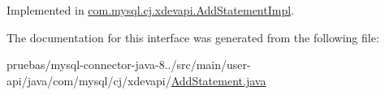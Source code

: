 Implemented in \mbox{\hyperlink{classcom_1_1mysql_1_1cj_1_1xdevapi_1_1_add_statement_impl_a8470fab763b1cfa3555d5dfd7854df2c}{com.\+mysql.\+cj.\+xdevapi.\+Add\+Statement\+Impl}}.



The documentation for this interface was generated from the following file\+:\begin{DoxyCompactItemize}
\item 
pruebas/mysql-\/connector-\/java-\/8../src/main/user-\/api/java/com/mysql/cj/xdevapi/\mbox{\hyperlink{_add_statement_8java}{Add\+Statement.\+java}}\end{DoxyCompactItemize}

